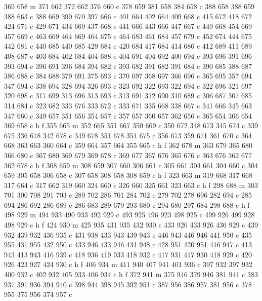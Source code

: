 {{   369 658 m
   371 662 372 662 376 660 c
   378 659 381 658 384 658 c
   388 658 388 659 388 663 c
   388 669 390 670 397 666 c
   401 664 402 664 409 668 c
   415 672 418 672 424 671 c
   429 671 434 669 437 668 c
   441 666 443 666 447 667 c
   449 668 454 669 457 669 c
   463 669 464 669 464 675 c
   464 683 461 684 457 679 c
   452 674 444 675 442 681 c
   440 685 440 685 429 684 c
   420 684 417 684 414 686 c
   412 689 411 689 408 687 c
   403 684 402 684 404 688 c
   404 691 404 692 400 694 c
   393 696 391 696 393 694 c
   396 691 396 684 394 682 c
   393 682 391 682 391 684 c
   390 685 388 687 386 688 c
   384 688 379 691 375 693 c
   370 697 368 697 366 696 c
   365 695 357 694 347 694 c
   338 694 328 694 326 693 c
   323 692 322 693 322 694 c
   322 696 321 697 320 698 c
   317 699 313 696 313 693 c
   313 691 312 690 310 689 c
   306 687 307 685 314 684 c
   323 682 333 676 333 672 c
   333 671 335 668 338 667 c
   341 666 345 663 347 660 c
   349 657 351 656 354 657 c
   357 657 360 657 362 656 c
   365 654 366 654 369 658 c
   h f
   355 665 m
   352 665 351 667 350 669 c
   350 672 348 673 345 674 c
   339 675 336 678 342 678 c
   349 678 351 678 354 675 c
   356 673 359 671 361 670 c
   364 668 363 663 360 664 c
   359 664 357 664 355 665 c
   h f
   362 678 m
   363 679 365 680 366 680 c
   367 680 369 679 369 678 c
   369 677 367 676 365 676 c
   363 676 362 677 362 678 c
   h f
   308 659 m
   308 659 307 660 306 661 c
   305 661 304 661 304 660 c
   304 659 305 658 306 658 c
   307 658 308 658 308 659 c
   h f
   323 663 m
   319 668 317 668 317 664 c
   317 662 319 660 324 660 c
   326 660 325 661 323 663 c
   h f
   298 688 m
   303 701 300 708 291 703 c
   289 702 286 701 284 702 c
   279 702 278 696 282 694 c
   285 694 286 692 286 689 c
   286 683 289 679 293 680 c
   294 680 297 684 298 688 c
   h f
   498 929 m
   494 933 490 933 492 929 c
   493 925 496 923 498 925 c
   499 926 499 928 498 929 c
   h f
   424 930 m
   425 935 431 935 432 930 c
   433 926 433 926 436 929 c
   439 932 439 932 436 935 c
   431 938 433 943 439 943 c
   446 943 446 946 441 950 c
   435 955 431 955 432 950 c
   433 946 433 946 431 948 c
   428 951 420 951 416 947 c
   413 943 413 943 416 939 c
   418 936 419 933 418 932 c
   417 931 417 930 418 929 c
   420 926 423 927 424 930 c
   h f
   406 934 m
   411 940 407 941 401 936 c
   397 932 397 932 400 932 c
   402 932 405 933 406 934 c
   h f
   372 941 m
   375 946 379 946 381 941 c
   383 937 391 936 394 940 c
   398 944 398 945 392 951 c
   387 956 386 957 381 956 c
   378 955 375 956 374 957 c
}}
